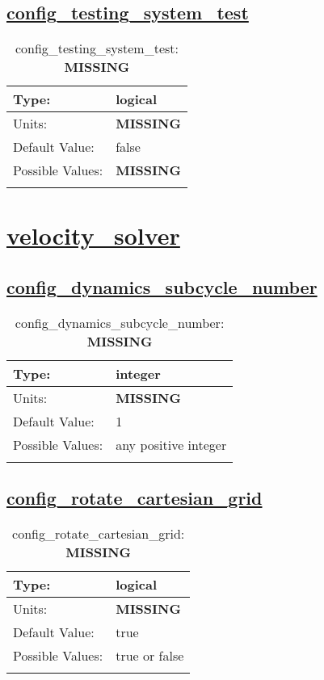 \subsection[config\_testing\_system\_test]{\hyperref[sec:nm_tab_unit_test]{config\_testing\_system\_test}}
\label{subsec:nm_sec_config_testing_system_test}
\begin{center}
\begin{longtable}{| p{2.0in} || p{4.0in} |}
    \hline
    Type: & logical \\
    \hline
    Units: & {\bf \color{red} MISSING} \\
    \hline
    Default Value: & false \\
    \hline
    Possible Values: & {\bf \color{red} MISSING} \\
    \hline
    \caption{config\_testing\_system\_test: {\bf \color{red} MISSING}}
\end{longtable}
\end{center}
\section[velocity\_solver]{\hyperref[sec:nm_tab_velocity_solver]{velocity\_solver}}
\label{sec:nm_sec_velocity_solver}
\subsection[config\_dynamics\_subcycle\_number]{\hyperref[sec:nm_tab_velocity_solver]{config\_dynamics\_subcycle\_number}}
\label{subsec:nm_sec_config_dynamics_subcycle_number}
\begin{center}
\begin{longtable}{| p{2.0in} || p{4.0in} |}
    \hline
    Type: & integer \\
    \hline
    Units: & {\bf \color{red} MISSING} \\
    \hline
    Default Value: & 1 \\
    \hline
    Possible Values: & any positive integer \\
    \hline
    \caption{config\_dynamics\_subcycle\_number: {\bf \color{red} MISSING}}
\end{longtable}
\end{center}
\subsection[config\_rotate\_cartesian\_grid]{\hyperref[sec:nm_tab_velocity_solver]{config\_rotate\_cartesian\_grid}}
\label{subsec:nm_sec_config_rotate_cartesian_grid}
\begin{center}
\begin{longtable}{| p{2.0in} || p{4.0in} |}
    \hline
    Type: & logical \\
    \hline
    Units: & {\bf \color{red} MISSING} \\
    \hline
    Default Value: & true \\
    \hline
    Possible Values: & true or false \\
    \hline
    \caption{config\_rotate\_cartesian\_grid: {\bf \color{red} MISSING}}
\end{longtable}
\end{center}
